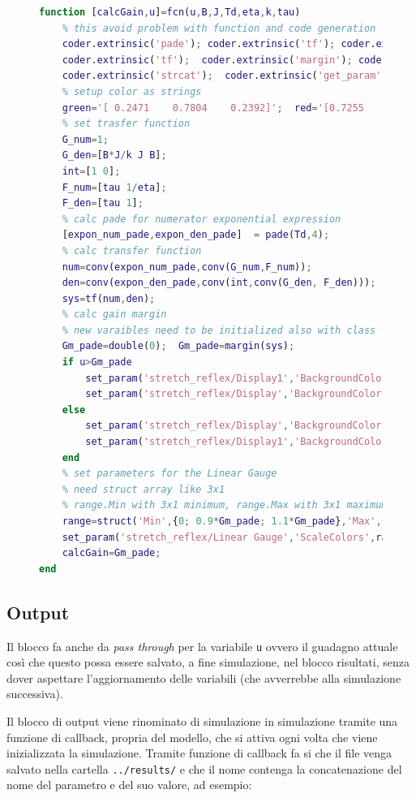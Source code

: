 \begin{figure}[h!]
\begin{lstlisting}[language=matlab,style=mystyle]
function [calcGain,u]=fcn(u,B,J,Td,eta,k,tau)
	% this avoid problem with function and code generation
	coder.extrinsic('pade'); coder.extrinsic('tf'); coder.extrinsic('rlocus')
	coder.extrinsic('tf'); 	coder.extrinsic('margin'); coder.extrinsic('type')
	coder.extrinsic('strcat'); 	coder.extrinsic('get_param'); 	coder.extrinsic('set_param')
	% setup color as strings
	green='[ 0.2471    0.7804    0.2392]'; 	red='[0.7255    0.2941    0.2100]';	
	% set trasfer function
	G_num=1;
	G_den=[B*J/k J B];
	int=[1 0];
	F_num=[tau 1/eta];
	F_den=[tau 1];
	% calc pade for numerator exponential expression
	[expon_num_pade,expon_den_pade]  = pade(Td,4);
	% calc transfer function
	num=conv(expon_num_pade,conv(G_num,F_num));
	den=conv(expon_den_pade,conv(int,conv(G_den, F_den)));
	sys=tf(num,den);
	% calc gain margin
	% new varaibles need to be initialized also with class type
	Gm_pade=double(0); 	Gm_pade=margin(sys);
	if u>Gm_pade
		set_param('stretch_reflex/Display1','BackgroundColor',red);
		set_param('stretch_reflex/Display','BackgroundColor',red);
	else
		set_param('stretch_reflex/Display','BackgroundColor',green);
		set_param('stretch_reflex/Display1','BackgroundColor',green);
	end
	% set parameters for the Linear Gauge
	% need struct array like 3x1
	% range.Min with 3x1 minimum, range.Max with 3x1 maximum,  range.Color with [r g b] color
	range=struct('Min',{0; 0.9*Gm_pade; 1.1*Gm_pade},'Max',{0.9*Gm_pade; 1.1*Gm_pade; 250},'Color',{[0.2471  0.7804 0.2392];[0.9294 0.6941 0.1255]; [0.7255 0.2941 0.2000]});
	set_param('stretch_reflex/Linear Gauge','ScaleColors',range)
	calcGain=Gm_pade;
end
\end{lstlisting}
\end{figure}

\subsection{Output}

Il blocco fa anche da \textit{pass through} per la variabile \texttt{u} ovvero il guadagno attuale così che questo possa essere salvato, a fine simulazione, nel blocco risultati, senza dover aspettare l'aggiornamento delle variabili (che avverrebbe alla simulazione successiva).

Il blocco di output viene rinominato di simulazione in simulazione tramite una funzione di callback, propria del modello, che si attiva ogni volta che viene inizializzata la simulazione. Tramite funzione di callback fa si che il file venga salvato nella cartella \texttt{../results/} e che il nome contenga la concatenazione del nome del parametro e del suo valore, ad esempio:

